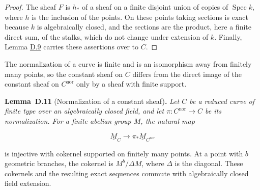 \documentclass[11pt]{article}
\newenvironment{bpstatement}[2]{\par\addvspace{0.6\baselineskip}\noindent\textbf{#1}#2\textbf{.}\enspace\ignorespaces}
  {\par\addvspace{0.4\baselineskip}}
\newenvironment{bpstatementit}[2]{\begin{bpstatement}{#1}{#2}\itshape\ignorespaces}{\end{bpstatement}}
\begin{document}
\begin{proof}[{Proof}]\label{bp205}%
The sheaf \(F\) is \(h_*\) of a sheaf on a finite disjoint union of copies of \(\operatorname{Spec}k\), where \(h\) is the inclusion of the points. On these points taking sections is exact because \(k\) is algebraically closed, and the sections are the product, here a finite direct sum, of the stalks, which do not change under extension of \(k\). Finally, Lemma \hyperref[bp201]{D.9} carries these assertions over to \(C\).
\end{proof}

\label{bp206}%
The normalization of a curve is finite and is an isomorphism away from finitely many points, so the constant sheaf on \(C\) differs from the direct image of the constant sheaf on \(C^{\mathrm{nor}}\) only by a sheaf with finite support.

\label{bp207}%
\begin{bpstatementit}{Lemma~D.11}{ (Normalization of a constant sheaf)}
Let \(C\) be a reduced curve of finite type over an algebraically closed field, and let \(\pi:C^{\mathrm{nor}}\to C\) be its normalization.  For a finite abelian group \(M\), the natural map

\[
\underline M_C\longrightarrow \pi_*\underline M_{C^{\mathrm{nor}}}
\]

is injective with cokernel supported on finitely many points.  At a point with \(b\) geometric branches, the cokernel is \(M^b/\Delta M\), where \(\Delta\) is the diagonal. These cokernels and the resulting exact sequences commute with algebraically closed field extension.
\end{bpstatementit}
\end{document}
